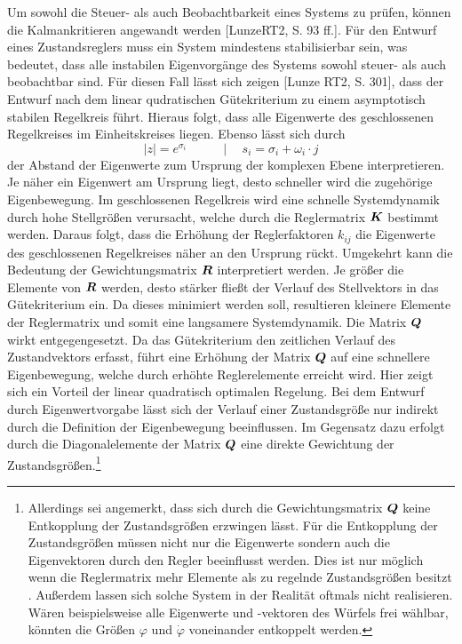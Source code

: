 Um sowohl die Steuer- als auch Beobachtbarkeit eines Systems zu prüfen, können die Kalmankritieren angewandt werden [LunzeRT2, S. 93 ff.]. Für den Entwurf eines Zustandsreglers muss ein System mindestens stabilisierbar sein, was bedeutet, dass alle instabilen Eigenvorgänge des Systems sowohl steuer- als auch beobachtbar sind. Für diesen Fall lässt sich zeigen [Lunze RT2, S. 301], dass der Entwurf nach dem linear qudratischen Gütekriterium zu einem asymptotisch stabilen Regelkreis führt. Hieraus folgt, dass alle Eigenwerte des geschlossenen Regelkreises im Einheitskreises liegen. Ebenso lässt sich durch
\begin{equation}
\vert z\vert = e^{\sigma_i} \hspace{35pt} \vert \hspace{15pt} s_i = \sigma_i + \omega_i\cdot j
\end{equation}
der Abstand der Eigenwerte zum Ursprung der komplexen Ebene interpretieren. Je näher ein Eigenwert am Ursprung liegt, desto schneller wird die zugehörige Eigenbewegung. Im geschlossenen Regelkreis wird eine schnelle Systemdynamik durch hohe Stellgrößen verursacht, welche durch die Reglermatrix $\boldsymbol{K}$ bestimmt werden. Daraus folgt, dass die Erhöhung der Reglerfaktoren $k_{ij}$ die Eigenwerte des geschlossenen Regelkreises näher an den Ursprung rückt. Umgekehrt kann die Bedeutung der Gewichtungsmatrix $\boldsymbol{R}$ interpretiert werden. Je größer die Elemente von $\boldsymbol{R}$ werden, desto stärker fließt der Verlauf des Stellvektors in das Gütekriterium ein. Da dieses minimiert werden soll, resultieren kleinere Elemente der Reglermatrix und somit eine langsamere Systemdynamik.
Die Matrix $\boldsymbol{Q}$ wirkt entgegengesetzt. Da das Gütekriterium den zeitlichen Verlauf des Zustandvektors erfasst, führt eine Erhöhung der Matrix $\boldsymbol{Q}$ auf eine schnellere Eigenbewegung, welche durch erhöhte Reglerelemente erreicht wird. Hier zeigt sich ein Vorteil der linear quadratisch optimalen Regelung. Bei dem Entwurf durch Eigenwertvorgabe lässt sich der Verlauf einer Zustandsgröße nur indirekt durch die Definition der Eigenbewegung beeinflussen. Im Gegensatz dazu erfolgt durch die Diagonalelemente der Matrix $\boldsymbol{Q}$ eine direkte Gewichtung der Zustandsgrößen.\footnote{Allerdings sei angemerkt, dass sich durch die Gewichtungsmatrix $\boldsymbol{Q}$ keine Entkopplung der Zustandsgrößen erzwingen lässt. Für die Entkopplung der Zustandsgrößen müssen nicht nur die Eigenwerte sondern auch die Eigenvektoren durch den Regler beeinflusst werden. Dies ist nur möglich wenn die Reglermatrix mehr Elemente als zu regelnde Zustandsgrößen besitzt \cite[S. 254 ff.]{LunzeRT2}. Außerdem lassen sich solche System in der Realität oftmals nicht realisieren. Wären beispielsweise alle Eigenwerte und -vektoren des Würfels frei wählbar, könnten die Größen $\varphi$ und $\dot{\varphi}$ voneinander entkoppelt werden.}

